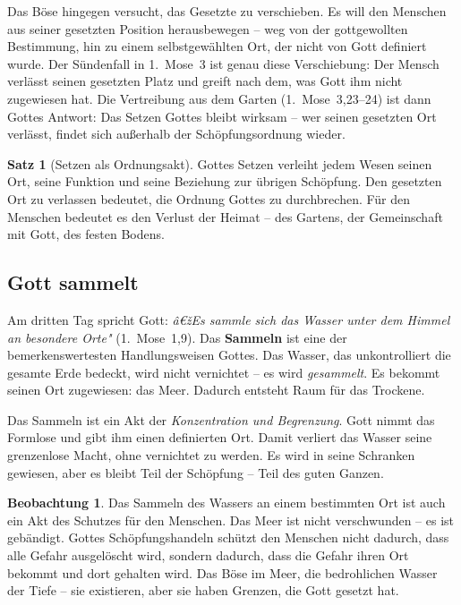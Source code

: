 ﻿\documentclass[a4paper,12pt]{article}
\theoremstyle{definition}
\newtheorem{theorem}{Satz}[section]
\newtheorem{observation}{Beobachtung}[section]
\begin{document}
Das Böse hingegen versucht, das Gesetzte zu verschieben. Es will den Menschen
aus seiner gesetzten Position herausbewegen -- weg von der gottgewollten
Bestimmung, hin zu einem selbstgewählten Ort, der nicht von Gott definiert wurde.
Der Sündenfall in 1.~Mose~3 ist genau diese Verschiebung: Der Mensch verlässt
seinen gesetzten Platz und greift nach dem, was Gott ihm nicht zugewiesen hat.
Die Vertreibung aus dem Garten (1.~Mose~3,23--24) ist dann Gottes Antwort: Das
Setzen Gottes bleibt wirksam -- wer seinen gesetzten Ort verlässt, findet sich
außerhalb der Schöpfungsordnung wieder.

\begin{theorem}[Setzen als Ordnungsakt]
	Gottes Setzen verleiht jedem Wesen seinen Ort, seine Funktion und seine
	Beziehung zur übrigen Schöpfung. Den gesetzten Ort zu verlassen bedeutet,
	die Ordnung Gottes zu durchbrechen. Für den Menschen bedeutet es den Verlust
	der Heimat -- des Gartens, der Gemeinschaft mit Gott, des festen Bodens.
\end{theorem}

\subsection{Gott sammelt}

Am dritten Tag spricht Gott: \textit{â€žEs sammle sich das Wasser unter dem Himmel
	an besondere Orte"} (1.~Mose~1,9). Das \textbf{Sammeln} ist eine der
bemerkenswertesten Handlungsweisen Gottes. Das Wasser, das unkontrolliert die
gesamte Erde bedeckt, wird nicht vernichtet -- es wird \textit{gesammelt}. Es
bekommt seinen Ort zugewiesen: das Meer. Dadurch entsteht Raum für das Trockene.

Das Sammeln ist ein Akt der \textit{Konzentration und Begrenzung}. Gott nimmt
das Formlose und gibt ihm einen definierten Ort. Damit verliert das Wasser seine
grenzenlose Macht, ohne vernichtet zu werden. Es wird in seine Schranken gewiesen,
aber es bleibt Teil der Schöpfung -- Teil des guten Ganzen.

\begin{observation}
	Das Sammeln des Wassers an einem bestimmten Ort ist auch ein Akt des Schutzes
	für den Menschen. Das Meer ist nicht verschwunden -- es ist gebändigt. Gottes
	Schöpfungshandeln schützt den Menschen nicht dadurch, dass alle Gefahr
	ausgelöscht wird, sondern dadurch, dass die Gefahr ihren Ort bekommt und dort
	gehalten wird. Das Böse im Meer, die bedrohlichen Wasser der Tiefe -- sie
	existieren, aber sie haben Grenzen, die Gott gesetzt hat.
\end{observation}
\end{document}
